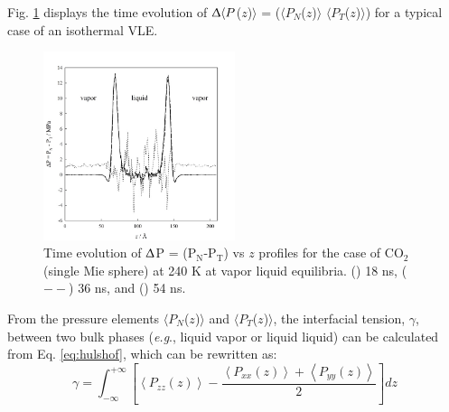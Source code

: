 \documentclass[9pt,bestpractices]{livecoms}
\begin{document}
Fig. \ref{fig:17} displays the time evolution of 
${\Updelta}{\langle}P$($z$)${\rangle}$
= (${\langle}P_{N}$($z$)${\rangle}$ \textendash{}
${\langle}P_{T}$($z$)${\rangle}$) for a typical case of an
isothermal VLE. 
\begin{figure}
\includegraphics[width=0.5\textwidth]{gfx/image61.jpeg}
\caption{Time evolution of {${\Updelta}$}P = (P$_{\mathrm{N}}$-P$_{\mathrm{T}}$) vs $z$ profiles for the case of CO$_{2}$ (single Mie sphere) at 240 K at vapor \textendash{} liquid equilibria. ({\textbullet}{\textbullet}{\textbullet}) 18 ns, (${-}{-}$) 36 ns, and (\textemdash) 54 ns.}
\label{fig:17}
\end{figure}
From the pressure elements ${\langle}P_{N}$($z$)${\rangle}$
and ${\langle}P_{T}$($z$)${\rangle}$, the interfacial
tension, ${\gamma}$, between two bulk phases (\textit{e.g}., liquid
\textendash{} vapor or liquid \textendash{} liquid) can be calculated from Eq.
\ref{eq:hulshof}, which can be rewritten as:
\begin{equation}
\gamma=\int_{{\scriptstyle -\infty}}^{{\scriptstyle +\infty}}\left[\left\langle P_{zz}\left(z\right)\right\rangle -\frac{\left\langle P_{xx}\left(z\right)\right\rangle +\left\langle P_{yy}\left(z\right)\right\rangle }{2}\right]dz
  \label{eq:12}
\end{equation}
\end{document}
